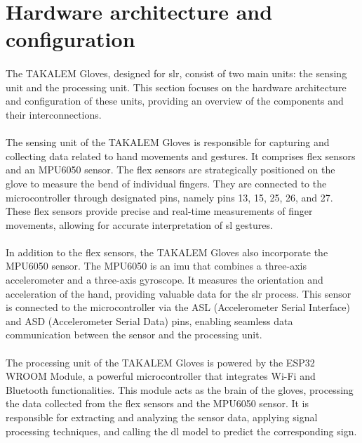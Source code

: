 \section{Hardware architecture and configuration}
\paragraph{}
The TAKALEM Gloves, designed for \ac{slr}, consist of two main units: the sensing unit and the processing unit. This section focuses on the hardware architecture and configuration of these units, providing an overview of the components and their interconnections.
\paragraph{}
The sensing unit of the TAKALEM Gloves is responsible for capturing and collecting data related to hand movements and gestures. It comprises flex sensors and an MPU6050 sensor. The flex sensors are strategically positioned on the glove to measure the bend of individual fingers. They are connected to the microcontroller through designated pins, namely pins 13, 15, 25, 26, and 27. These flex sensors provide precise and real-time measurements of finger movements, allowing for accurate interpretation of \ac{sl} gestures.
\paragraph{}
In addition to the flex sensors, the TAKALEM Gloves also incorporate the MPU6050 sensor. The MPU6050 is an \ac{imu} that combines a three-axis accelerometer and a three-axis gyroscope. It measures the orientation and acceleration of the hand, providing valuable data for the \ac{slr} process. This sensor is connected to the microcontroller via the ASL (Accelerometer Serial Interface) and ASD (Accelerometer Serial Data) pins, enabling seamless data communication between the sensor and the processing unit.
\paragraph{}
The processing unit of the TAKALEM Gloves is powered by the ESP32 WROOM Module, a powerful microcontroller that integrates Wi-Fi and Bluetooth functionalities. This module acts as the brain of the gloves, processing the data collected from the flex sensors and the MPU6050 sensor. It is responsible for extracting and analyzing the sensor data, applying signal processing techniques, and calling the \ac{dl} model to predict the corresponding sign.
